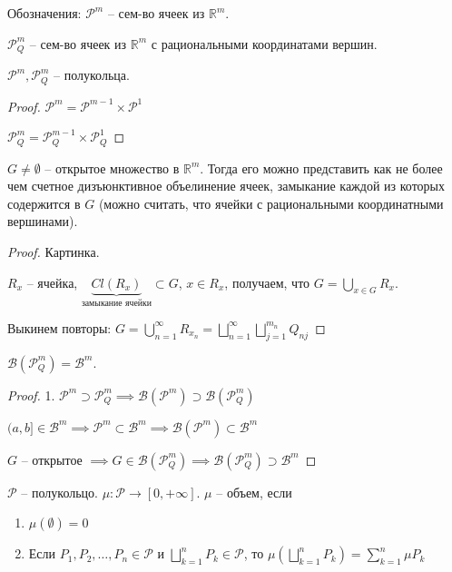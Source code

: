 Обозначения: $\mathcal{P}^m$ -- сем-во ячеек из $\mathbb{R}^m$.

$\mathcal{P}_{Q}^{m}$ -- сем-во ячеек из $\mathbb{R}^m$ с рациональными координатами вершин.

\begin{theorem}
    $\mathcal{P}^m, \mathcal{P}^m_Q$ -- полукольца.
\end{theorem}
\begin{proof}
    $\mathcal{P}^m = \mathcal{P}^{m-1} \times \mathcal{P}^1$

    $\mathcal{P}_Q^m = \mathcal{P}_Q^{m-1} \times \mathcal{P}_Q^1$
\end{proof}

\begin{theorem}
    $G \neq \emptyset$ -- открытое множество в $\mathbb{R}^m$. Тогда его можно представить как не более чем счетное дизъюнктивное объелинение ячеек, замыкание каждой из которых содержится в $G$ (можно считать, что ячейки с рациональными координатными вершинами).
\end{theorem}
\begin{proof}
    Картинка.

    $R_x$ -- ячейка, $\underbrace{Cl  (R_x)}_{\text{замыкание ячейки}} \subset G$, $x \in R_x$, получаем, что $G = \bigcup_{x \in G} R_x$.

    Выкинем повторы: $G = \bigcup_{n=1}^{\infty} R_{x_n} = \bigsqcup_{n=1}^{\infty} \bigsqcup_{j=1}^{m_n} Q_{nj}$
\end{proof}

\begin{consequence}
    $\mathcal{B}(\mathcal{P}^m_Q) = \mathcal{B}^m$.
\end{consequence}
\begin{proof}
    
    1. $\mathcal{P}^m \supset \mathcal{P}^m_Q \implies \mathcal{B}(\mathcal{P}^m) \supset \mathcal{B}(\mathcal{P}_Q^m)$

    $(a, b] \in \mathcal{B}^m \implies \mathcal{P}^m \subset \mathcal{B}^m \implies \mathcal{B}(\mathcal{P}^m) \subset \mathcal{B}^m$

    $G$ -- открытое $\implies G \in \mathcal{B}(\mathcal{P}_Q^m) \implies \mathcal{B}(\mathcal{P}^m_Q) \supset \mathcal{B}^m$
\end{proof}

\begin{definition}
    $\mathcal{P}$ -- полукольцо. $\mu: \mathcal{P} \rightarrow [0, +\infty]$. $\mu$ -- объем, если 

    \begin{enumerate}
        \item $\mu(\emptyset) = 0$
        \item Если $P_1, P_2, \dots, P_n \in \mathcal{P}$ и $\bigsqcup_{k=1}^n P_k \in \mathcal{P}$, то $\mu \left(\bigsqcup_{k=1}^n P_k\right) = \sum_{k=1}^{n} \mu P_k$ 
    \end{enumerate}
\end{definition}

